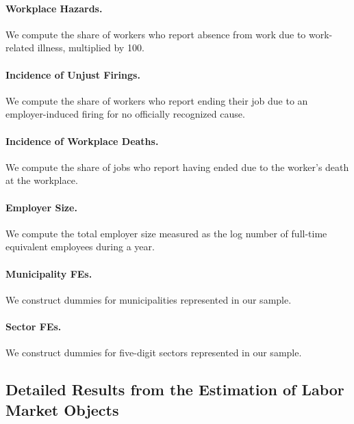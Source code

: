 \paragraph{Workplace Hazards.}

We compute the share of workers who report absence from work due to work-related illness, multiplied by 100.


\paragraph{Incidence of Unjust Firings.}

We compute the share of workers who report ending their job due to an employer-induced firing for no officially recognized cause.


\paragraph{Incidence of Workplace Deaths.}

We compute the share of jobs who report having ended due to the worker's death at the workplace.


\paragraph{Employer Size.}

We compute the total employer size measured as the log number of full-time equivalent employees during a year.


\paragraph{Municipality FEs.}

We construct dummies for {\NMunicipalities} municipalities represented in our sample.


\paragraph{Sector FEs.}

We construct dummies for {\NSectors} five-digit sectors represented in our sample.


\subsection{Detailed Results from the Estimation of Labor Market Objects\label{app:other_results_lmkt_objects}}

